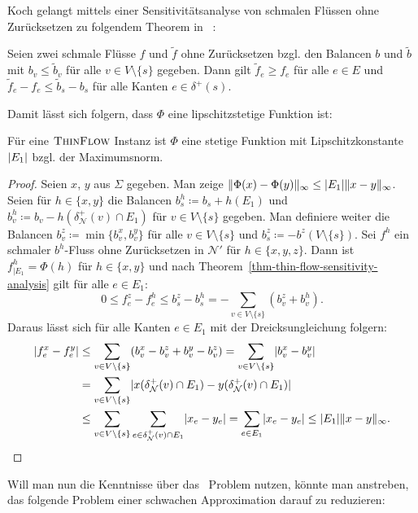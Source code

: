Koch gelangt mittels einer Sensitivitätsanalyse von schmalen Flüssen ohne Zurück\-setzen zu folgendem Theorem in ~\cite[Theorem 6.53]{Koch2012}:
\begin{theorem}\label{thm-thin-flow-sensitivity-analysis}
	Seien zwei schmale Flüsse $f$ und $\tilde{f}$ ohne Zurücksetzen bzgl. den Balancen $b$ und $\tilde{b}$ mit $b_v \leq \tilde{b}_v$ für alle $v\in V \setminus \{ s \}$ gegeben.
	Dann gilt $\tilde{f}_e \geq f_e$ für alle $e\in E$ und $\tilde{f}_e - f_e \leq \tilde{b}_s - b_s$ für alle Kanten $e\in\delta^+(s)$.
\end{theorem}

Damit lässt sich folgern, dass $\Phi$ eine lipschitzstetige Funktion ist:
\begin{corollary}
	Für eine $\textsc{ThinFlow}$ Instanz ist $\Phi$ eine stetige Funktion mit Lipschitzkonstante $\lvert E_1\rvert$ bzgl. der Maximumsnorm.
\end{corollary}
\begin{proof}
	Seien $x$, $y$ aus $\Sigma$ gegeben.
	Man zeige $\lVert\Phi(x) - \Phi(y)\rVert_\infty \leq \lvert E_1\rvert \lVert x- y\rVert_\infty $.
	Seien für $h\in \{ x,y \}$ die Balancen $b_s^h \coloneq b_s + h(E_1)$ und $b_v^h\coloneq b_v - h(\delta^+_\mathcal{N}(v) \cap E_1)$ für $v\in V\setminus\{ s\}$ gegeben.
	Man definiere weiter die Balancen $b_v^z \coloneq \min \{ b_v^x, b_v^y \}$ für alle $v\in V\setminus \{ s\}$ und $b_s^z\coloneq -b^z(V\setminus \{ s\})$.
	Sei $f^h$ ein schmaler $b^h$-Fluss ohne Zurücksetzen in $\mathcal{N}'$ für $h\in \{x, y, z\}$.
	Dann ist $f^h_{\mid E_1} = \Phi(h)$ für $h\in \{x,y \}$ und nach Theorem~\ref{thm-thin-flow-sensitivity-analysis} gilt für alle $e\in E_1$:
	\[
		0\leq f_e^z - f_e^h \leq b_s^z - b_s^h = - \sum_{v\in V\setminus\{ s\}} (b_v^z + b_v^h).
	\]
	Daraus lässt sich für alle Kanten $e\in E_1$ mit der Dreicksungleichung folgern:
	\begin{align*}
		\lvert f_e^x - f_e^y\rvert &\leq \sum_{v\in V\setminus\{s \}} (b_v^x - b_v^z + b_v^y - b_v^z) = \sum_{v\in V\setminus\{s\}} \lvert b_v^x - b_v^y\rvert\\
		& = \sum_{v\in V\setminus\{s\}} \lvert x(\delta^+_\mathcal{N}(v) \cap E_1) - y(\delta^+_\mathcal{N}(v) \cap E_1)\rvert \\
		&\leq \sum_{v\in V\setminus\{ s\}} \sum_{e\in\delta^+_\mathcal{N}(v)\cap E_1} \lvert x_e - y_e\rvert = \sum_{e\in E_1} \lvert x_e - y_e\rvert \leq \lvert E_1\rvert \lVert x-y\rVert_\infty.
	\end{align*}
\end{proof}

Will man nun die Kenntnisse über das \Brouwer\ Problem nutzen, könnte man anstreben, das folgende Problem einer schwachen Approximation darauf zu reduzieren:

